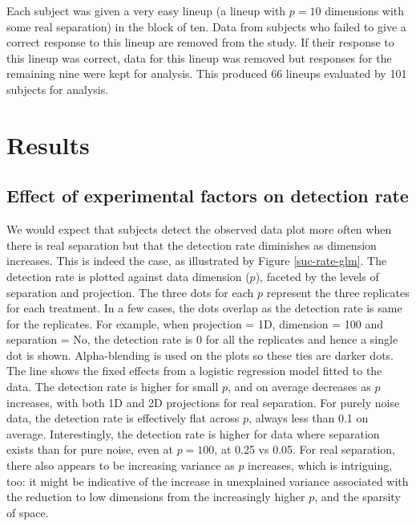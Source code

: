 
Each subject was given a very easy lineup (a lineup with $p = 10$ dimensions with some real separation) in the block of ten. Data from subjects who failed to give a correct response to this lineup are removed from the study. If their response to this lineup was correct, data for this lineup was removed but responses for the remaining nine were kept for analysis. This produced 66 lineups evaluated by 101 subjects for analysis.


\section{Results} \label{sec:results}

\subsection{Effect of experimental factors on detection rate} \label{effects}

We would expect that subjects detect the observed data plot more often when there is real separation but that the detection rate diminishes as dimension increases. This is indeed the case, as illustrated by Figure \ref{suc-rate-glm}. The detection rate is plotted against data dimension ($p$), faceted by the levels of separation and projection. The three dots for each $p$ represent the three replicates for each treatment. In a few cases, the dots overlap as the detection rate is same for the replicates. For example, when projection = 1D, dimension = 100 and separation = No, the detection rate is 0 for all the replicates and hence a single dot is shown. Alpha-blending is used on the plots so these ties are darker dots. The line shows the fixed effects from a logistic regression model fitted to the data. The detection rate is higher for small $p$, and on average decreases as $p$ increases, with both 1D and 2D projections for real separation. For purely noise data, the detection rate is effectively flat across $p$, always less than 0.1 on average. Interestingly, the detection rate is higher for data where separation exists than for pure noise, even at $p = 100$, at 0.25 vs 0.05. For real separation, there also appears to be increasing variance as $p$ increases, which is intriguing, too: it might be indicative of the increase in unexplained variance associated with the reduction to low dimensions from the increasingly higher $p$, and the sparsity of space.


